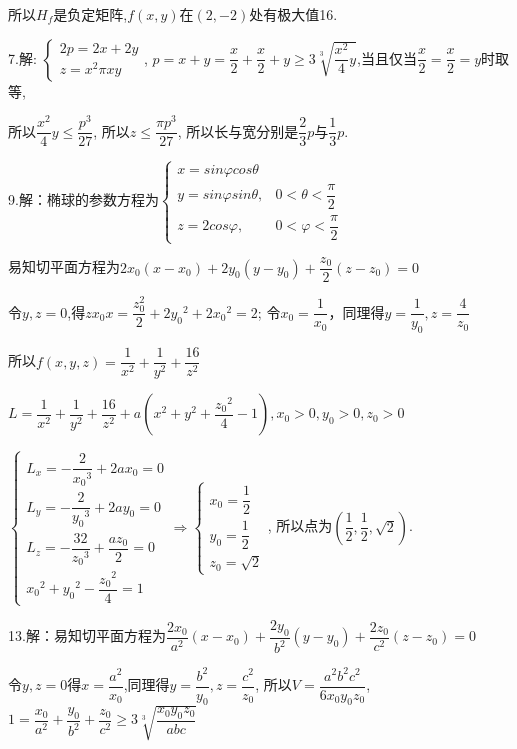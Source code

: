     所以$ H_f$是负定矩阵,$f(x,y)$在$(2,-2)$处有极大值16.

    7.解: $\begin{cases}2p=2x+2y\\z=x^2\pi xy\end{cases}$,
    $p=x+y=\dfrac{x}{2} + \dfrac{x}{2} + y \ge 3\sqrt[3]{{\dfrac{x^2}{4}y}}$,当且仅当$\dfrac{x}{2} = \dfrac{x}{2} = y$时取等,

    所以$\dfrac{x^2}{4}y \le \dfrac{p^3}{{27}}$,
    所以$ z \le \dfrac{{\pi p^3}}{{27}}$,
    所以长与宽分别是$\dfrac{2}{3}p$与$\dfrac{1}{3}p$.

    9.解：椭球的参数方程为$\begin{cases}x=sin\varphi cos\theta \\y=sin\varphi sin\theta ,&0<\theta<\dfrac{\pi }{2}\\z=2cos\varphi ,&0<\varphi <\dfrac{\pi }{2}\end{cases}$

    易知切平面方程为$2x_0(x-x_0)+2y_0(y-y_0)+\dfrac{z_0}{2}(z-z_0)=0$

    令$y,z=0$,得$zx_0x=\dfrac{z^2_0}{2}+2{y_0}^2+2{x_0}^2=2$;
    令$x_0=\dfrac{1}{x_0}$，同理得$y=\dfrac{1}{y_0},z=\dfrac{4}{z_0}$

    所以$ f(x,y,z)=\dfrac{1}{x^2}+\dfrac{1}{y^2}+\dfrac{16}{z^2}$

    $L=\dfrac{1}{x^2}+\dfrac{1}{y^2}+\dfrac{16}{z^2}+a(x^2+y^2+\dfrac{{z_0}^2}{4}-1),x_0>0,y_0>0,z_0>0$

    $\begin{cases}L_x=-\dfrac{2}{{x_0}^3}+2ax_0=0\\L_y=-\dfrac{2}{{y_0}^3}+2ay_0=0\\L_z=-\dfrac{32}{{z_0}^3}+\dfrac{az_0}{2}=0\\{x_0}^2+{y_0}^2-\dfrac{{z_0}^2}{4}=1\end{cases}\Rightarrow \begin{cases}x_0=\dfrac{1}{2}\\y_0=\dfrac{1}{2}\\z_0=\sqrt 2 \end{cases}$,
    所以点为$(\dfrac{1}{2},\dfrac{1}{2},\sqrt 2)$.

    13.解：易知切平面方程为$\dfrac{2x_0}{a^2}(x-x_0)+\dfrac{2y_0}{b^2}(y-y_0)+\dfrac{2z_0}{c^2}(z-z_0)=0$

    令$y,z=0$得$x=\dfrac{a^2}{x_0}$,同理得$y=\dfrac{b^2}{y_0},z=\dfrac{c^2}{z_0}$,
    所以$V=\dfrac{a^2b^2c^2}{6x_0y_0z_0}$,
    $1=\dfrac{x_0}{a^2}+\dfrac{y_0}{b^2}+\dfrac{z_0}{c^2}\geq3\sqrt[3]{{\dfrac{{x_0y_0z_0}}{{abc}}}}$

